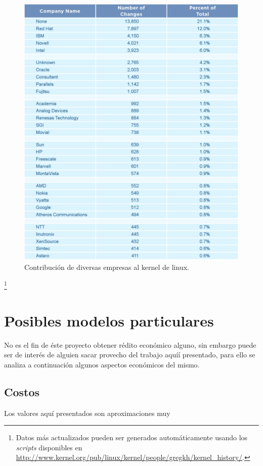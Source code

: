 \begin{figure}[htp]
\centering
\includegraphics[width=13cm]{./img/table4-companies.png}
\caption{Contribuci\'on de diversas empresas al kernel de linux.}
\label{fig:companies_contributions_to_linux}
\end{figure}\footnote{Datos m\'as actualizados pueden ser generados
autom\'aticamente usando los \emph{scripts} disponibles en
\url{http://www.kernel.org/pub/linux/kernel/people/gregkh/kernel_history/}.}


\section{Posibles modelos particulares}
%
No es el fin de \'este proyecto obtener r\'edito econ\'omico alguno, sin
embargo puede ser de inter\'es de alguien sacar provecho del trabajo aqu\'i\'i
presentado, para ello se analiza a continuaci\'on algunos aspectos
econ\'omicos del mismo.

\subsection{Costos}
Los valores aqu\'i presentados son aproximaciones muy %

